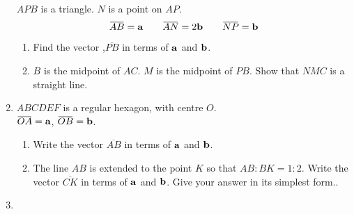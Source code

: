 \begin{enumerate}
\begin{figure}[H]
  \end{figure}
  $APB$ is a triangle. $N$ is a point on $AP$.
  $$
  \overbar{AB} = \vb{a}\qquad \overbar{AN} = 2\vb{b}\qquad \overbar{NP} = \vb{b}
  $$
  \begin{enumerate}
    \item Find the vector ,$\overbar{PB}$ in terms of $\vb{a}$ and $\vb{b}$.\\[2cm]\vspace*{0pt}\hfill\dline
    \item $B$ is the midpoint of $AC$. $M$ is the midpoint of $PB$. Show that $NMC$ is a straight line.\\[4cm]\vspace*{0pt}\hfill\dline
  \end{enumerate}
  \newpage
  \item \mbox{}
  \begin{figure}[H]
    \centering
  \end{figure}
  $ABCDEF$ is a regular hexagon, with centre $O$. \\
  $\overbar{OA} = \vb{a}$, $\overbar{OB} = \vb{b}$.
  \begin{enumerate}
    \item Write the vector $\overbar{AB}$ in terms of $\vb{a}$ and $\vb{b}$.\\[2cm]\vspace*{0pt}\hfill\dline
    \item The line $AB$ is extended to the point $K$ so that $AB : BK = 1 : 2$. Write the vector $\overbar{CK}$ in terms of $\vb{a}$ and $\vb{b}$. Give your answer in its simplest form..\\[5cm]\vspace*{0pt}\hfill\dline
  \end{enumerate}
  \newpage
  \item \mbox{}
  \begin{figure}[H]
    \centering
\end{figure}
\end{enumerate}
